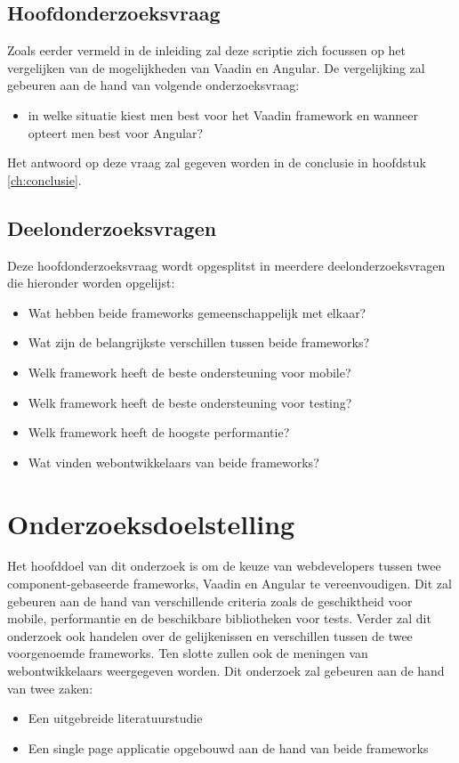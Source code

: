 \subsection{Hoofdonderzoeksvraag}
Zoals eerder vermeld in de inleiding zal deze scriptie zich focussen op het vergelijken van de mogelijkheden van Vaadin en Angular. De vergelijking zal gebeuren aan de hand van volgende onderzoeksvraag:
\begin{itemize}
	\item in welke situatie kiest men best voor het Vaadin framework en wanneer opteert men best voor Angular?
\end{itemize}
Het antwoord op deze vraag zal gegeven worden in de conclusie in hoofdstuk \ref*{ch:conclusie}.

\subsection{Deelonderzoeksvragen}
Deze hoofdonderzoeksvraag wordt opgesplitst in meerdere deelonderzoeksvragen die hieronder worden opgelijst:
\begin{itemize}
	\item Wat hebben beide frameworks gemeenschappelijk met elkaar?
	\item Wat zijn de belangrijkste verschillen tussen beide frameworks?
	\item Welk framework heeft de beste ondersteuning voor mobile?
	\item Welk framework heeft de beste ondersteuning voor testing?
	\item Welk framework heeft de hoogste performantie?
	\item Wat vinden webontwikkelaars van beide frameworks?
\end{itemize}

\section{Onderzoeksdoelstelling}
\label{sec:onderzoeksdoelstelling}

Het hoofddoel van dit onderzoek is om de keuze van webdevelopers tussen twee component-gebaseerde frameworks, Vaadin en Angular te vereenvoudigen. 
Dit zal gebeuren aan de hand van verschillende criteria zoals de geschiktheid voor mobile, performantie en de beschikbare bibliotheken voor tests. Verder zal dit onderzoek ook handelen over de gelijkenissen en verschillen tussen de twee voorgenoemde frameworks. 
Ten slotte zullen ook de meningen van webontwikkelaars weergegeven worden.
Dit onderzoek zal gebeuren aan de hand van twee zaken:
\begin{itemize}
	\item Een uitgebreide literatuurstudie
	\item Een single page applicatie opgebouwd aan de hand van beide frameworks
	
\end{itemize}

